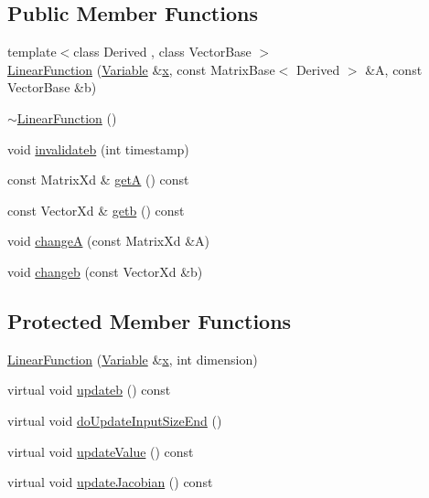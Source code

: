 \subsection*{Public Member Functions}
\begin{DoxyCompactItemize}
\item 
{\footnotesize template$<$class Derived , class Vector\+Base $>$ }\\\hyperlink{classocra_1_1LinearFunction_afb4fddc341c3c726f346acc962bead78}{Linear\+Function} (\hyperlink{classocra_1_1Variable}{Variable} \&\hyperlink{classocra_1_1Function_a28825886d1f149c87b112ec2ec1dd486}{x}, const Matrix\+Base$<$ Derived $>$ \&A, const Vector\+Base \&b)
\item 
\hyperlink{classocra_1_1LinearFunction_a0bdb80bc2a85566bc02dd143b6db7fdf}{$\sim$\+Linear\+Function} ()
\item 
void \hyperlink{classocra_1_1LinearFunction_a3faf4257b2a8ebd6426a054f4242fec8}{invalidateb} (int timestamp)
\end{DoxyCompactItemize}
{\bf }\par
\begin{DoxyCompactItemize}
\item 
const Matrix\+Xd \& \hyperlink{classocra_1_1LinearFunction_a7035c5f9ab621e976e09560c85a12fb2}{getA} () const
\item 
const Vector\+Xd \& \hyperlink{classocra_1_1LinearFunction_a485d83b0a3ad4c91e86f62494f9d7cef}{getb} () const
\item 
void \hyperlink{classocra_1_1LinearFunction_ab3ce18953520f3984fc260444775d157}{changeA} (const Matrix\+Xd \&A)
\item 
void \hyperlink{classocra_1_1LinearFunction_a2c62940f1529c04b4888a2f4d4bc235d}{changeb} (const Vector\+Xd \&b)
\end{DoxyCompactItemize}

\subsection*{Protected Member Functions}
\begin{DoxyCompactItemize}
\item 
\hyperlink{classocra_1_1LinearFunction_af44da8931811a95725d1d25c697aa5d2}{Linear\+Function} (\hyperlink{classocra_1_1Variable}{Variable} \&\hyperlink{classocra_1_1Function_a28825886d1f149c87b112ec2ec1dd486}{x}, int dimension)
\item 
virtual void \hyperlink{classocra_1_1LinearFunction_a546454cd8d0909f99433ffc0e700c9e3}{updateb} () const
\item 
virtual void \hyperlink{classocra_1_1LinearFunction_ac6bdf62ad6634397778d5f4223ed6d82}{do\+Update\+Input\+Size\+End} ()
\end{DoxyCompactItemize}
{\bf }\par
\begin{DoxyCompactItemize}
\item 
virtual void \hyperlink{classocra_1_1LinearFunction_a1b9fd7a03a8630055c117d19e0ff019a}{update\+Value} () const
\item 
virtual void \hyperlink{classocra_1_1LinearFunction_a30926f977c0124a0b0f65b854ab39636}{update\+Jacobian} () const
\end{DoxyCompactItemize}

